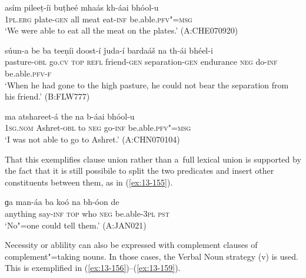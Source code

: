 \begin{exe}
\ex
\label{ex:13-152}
\gll asím pileeṭ-íi buṭheé mhaás kh-áai bhóol-u \\
\textsc{1pl.erg} plate-\textsc{gen} all meat eat-\textsc{inf} be.able.\textsc{pfv"=msg} \\
\glt `We were able to eat all the meat on the plates.' (A:CHE070920)

\ex
\label{ex:13-153}
\gll súun-a be ba teeṇíi doost-í  ǰuda-í bardaáš na th-ái bhéel-i \\
pasture-\textsc{obl} go.\textsc{cv} \textsc{top} \textsc{refl} friend-\textsc{gen} separation-\textsc{gen} endurance \textsc{neg} do-\textsc{inf} be.able.\textsc{pfv-f}  \\
\glt `When he had gone to the high pasture, he could not bear the separation from his friend.' (B:FLW777)

\ex
\label{ex:13-154}
\gll ma atshareet-á the na b-áai bhóol-u  \\
\textsc{1sg.nom} Ashret-\textsc{obl} to \textsc{neg} go-\textsc{inf} be.able.\textsc{pfv"=msg}  \\
\glt `I was not able to go to Ashret.' (A:CHN070104) 
\end{exe}

That this exemplifies clause union rather than a~full lexical union is supported by the fact that it is still possibile to split the two predicates and insert other constituents between them, as in (\ref{ex:13-155}).

\begin{exe}
\ex
\label{ex:13-155}
\gll ɡa man-áa ba koó na bh-óon de  \\
anything say-\textsc{inf} \textsc{top} who \textsc{neg} be.able-\textsc{3pl} \textsc{pst}  \\
\glt `No"=one could tell them.' (A:JAN021) 
\end{exe}

Necessity or ablility can also be expressed with complement clauses of complement"=taking nouns. In those cases, the Verbal Noun strategy (v) is used. This is exemplified in (\ref{ex:13-156})--(\ref{ex:13-159}).

